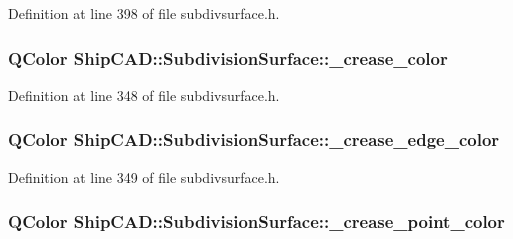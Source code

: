 Definition at line 398 of file subdivsurface.\-h.

\hypertarget{classShipCAD_1_1SubdivisionSurface_aaa3b772931e04f8650db2d005ae05d6a}{
\subsubsection[{\-\_\-crease\-\_\-color}]{\setlength{\rightskip}{0pt plus 5cm}Q\-Color Ship\-C\-A\-D\-::\-Subdivision\-Surface\-::\-\_\-crease\-\_\-color\hspace{0.3cm}{\ttfamily [protected]}}}\label{classShipCAD_1_1SubdivisionSurface_aaa3b772931e04f8650db2d005ae05d6a}


Definition at line 348 of file subdivsurface.\-h.

\hypertarget{classShipCAD_1_1SubdivisionSurface_a6106aee9d086aa377d9a3a6a6291b54c}{
\subsubsection[{\-\_\-crease\-\_\-edge\-\_\-color}]{\setlength{\rightskip}{0pt plus 5cm}Q\-Color Ship\-C\-A\-D\-::\-Subdivision\-Surface\-::\-\_\-crease\-\_\-edge\-\_\-color\hspace{0.3cm}{\ttfamily [protected]}}}\label{classShipCAD_1_1SubdivisionSurface_a6106aee9d086aa377d9a3a6a6291b54c}


Definition at line 349 of file subdivsurface.\-h.

\hypertarget{classShipCAD_1_1SubdivisionSurface_a9602182d9a123dc267d34a2cd1b45ed7}{
\subsubsection[{\-\_\-crease\-\_\-point\-\_\-color}]{\setlength{\rightskip}{0pt plus 5cm}Q\-Color Ship\-C\-A\-D\-::\-Subdivision\-Surface\-::\-\_\-crease\-\_\-point\-\_\-color\hspace{0.3cm}{\ttfamily [protected]}}}\label{classShipCAD_1_1SubdivisionSurface_a9602182d9a123dc267d34a2cd1b45ed7}



